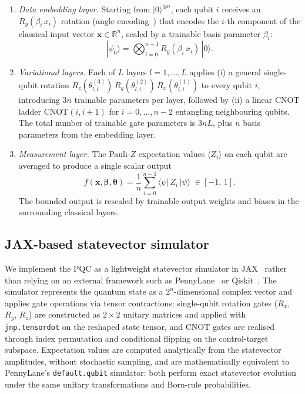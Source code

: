 \begin{enumerate}
  \item \emph{Data embedding layer.} Starting from $|0\rangle^{\otimes n}$, each qubit $i$ receives an $R_y(\beta_i\, x_i)$ rotation (angle encoding~\cite{schuld2021machine}) that encodes the $i$-th component of the classical input vector $\mathbf{x} \in \mathbb{R}^n$, scaled by a trainable basis parameter $\beta_i$:
    \begin{equation}
      |\psi_0\rangle = \bigotimes_{i=0}^{n-1} R_y(\beta_i\, x_i)\,|0\rangle.
    \end{equation}

  \item \emph{Variational layers.} Each of $L$ layers $l = 1, \ldots, L$ applies (i) a general single-qubit rotation $R_z(\theta^{(3)}_{l,i})\, R_y(\theta^{(2)}_{l,i})\, R_x(\theta^{(1)}_{l,i})$ to every qubit $i$, introducing $3n$ trainable parameters per layer, followed by (ii) a linear CNOT ladder $\text{CNOT}(i, i{+}1)$ for $i = 0, \ldots, n{-}2$ entangling neighbouring qubits. The total number of trainable gate parameters is $3nL$, plus $n$ basis parameters from the embedding layer.

  \item \emph{Measurement layer.} The Pauli-$Z$ expectation values $\langle Z_i \rangle$ on each qubit are averaged to produce a single scalar output
    \begin{equation}
      f(\mathbf{x}, \boldsymbol{\beta}, \boldsymbol{\theta})
      = \frac{1}{n} \sum_{i=0}^{n-1} \langle\psi|\, Z_i \,|\psi\rangle
      \;\in [-1,\, 1].
      \label{eq:pqc_output}
    \end{equation}
    The bounded output is rescaled by trainable output weights and biases in the surrounding classical layers.
\end{enumerate}

\subsection{JAX-based statevector simulator}
\label{sec:methods_statevector}

We implement the PQC as a lightweight statevector simulator in JAX~\parencite{jax2018github} rather than relying on an external framework such as PennyLane~\parencite{bergholm2022pennylaneautomaticdifferentiationhybrid} or Qiskit~\parencite{javadiabhari2024quantumcomputingqiskit}. The simulator represents the quantum state as a $2^n$-dimensional complex vector and applies gate operations via tensor contractions: single-qubit rotation gates ($R_x$, $R_y$, $R_z$) are constructed as $2\!\times\!2$ unitary matrices and applied with \texttt{jnp.tensordot} on the reshaped state tensor, and CNOT gates are realised through index permutation and conditional flipping on the control-target subspace. Expectation values are computed analytically from the statevector amplitudes, without stochastic sampling, and are mathematically equivalent to PennyLane's \texttt{default.qubit} simulator: both perform exact statevector evolution under the same unitary transformations and Born-rule probabilities.

